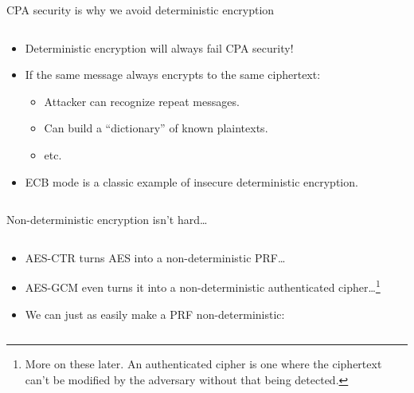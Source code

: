 \documentclass[aspectratio=169, lualatex, handout]{beamer}
\begin{document}
\begin{frame}{CPA security is why we avoid deterministic encryption}
	\begin{columns}[c]
		\begin{column}{0.5\textwidth}
			\begin{itemize}[<+->]
				\item Deterministic encryption will always fail CPA security!
				\item If the same message always encrypts to the same ciphertext:
				      \begin{itemize}
					      \item Attacker can recognize repeat messages.
					      \item Can build a ``dictionary'' of known plaintexts.
					      \item etc.
				      \end{itemize}
				\item ECB mode is a classic example of insecure deterministic encryption.
			\end{itemize}
		\end{column}
		\begin{column}{0.5\textwidth}
			\begin{center}
			\end{center}
		\end{column}
	\end{columns}
\end{frame}

\begin{frame}{Non-deterministic encryption isn't hard\ldots}
	\begin{columns}[c]
		\begin{column}{0.5\textwidth}
			\begin{itemize}[<+->]
				\item AES-CTR turns AES into a non-deterministic PRF\ldots
				\item AES-GCM even turns it into a non-deterministic authenticated cipher\ldots\footnote{More on these later. An authenticated cipher is one where the ciphertext can't be modified by the adversary without that being detected.}
				\item We can just as easily make a PRF non-deterministic:
			\end{itemize}
		\end{column}
		\begin{column}{0.5\textwidth}
		\end{column}
	\end{columns}
\end{frame}
\end{document}
